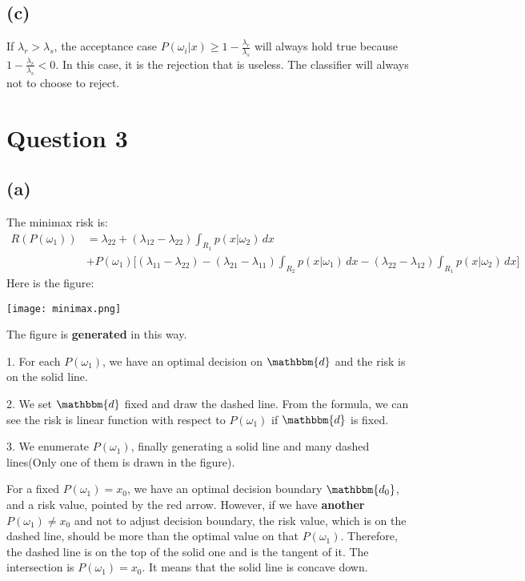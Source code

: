 \documentclass{article}
\newcommand{\question}[1]{\section*{Question #1}}
\renewcommand{\part}[1]{\subsection*{(#1)}}
\begin{document}
\part{c}
If $\lambda_r > \lambda_s$, the acceptance case $P(\omega_i | x) \geq 1 - \frac{\lambda_r}{\lambda_s}$ will always hold true because $1 - \frac{\lambda_r}{\lambda_s} < 0$. In this case, it is the rejection that is useless. The classifier will always not to choose to reject.
\question{3}
\part{a}
The minimax risk is:
\begin{align*}
  R(P(\omega_1)) &= \lambda_{22} + (\lambda_{12} - \lambda_{22}) \int_{R_1}p(x|\omega_2) \, dx \\
  &+ P(\omega_1) \bigg[ (\lambda_{11} - \lambda_{22}) - (\lambda_{21} - \lambda_{11})\int_{R_2}p(x|\omega_1) \, dx - (\lambda_{22} - \lambda_{12})\int_{R_1}p(x|\omega_2) \, dx \bigg ]
\end{align*}
Here is the figure: \\
\begin{center}
  \texttt{[image: minimax.png]}
\end{center} \par
The figure is \textbf{generated} in this way. \par
1. For each $P(\omega_1)$, we have an optimal decision on $\mathbbm{d}$ and the risk is on the solid line. \par
2. We set $\mathbbm{d}$ fixed and draw the dashed line. From the formula, we can see the risk is linear function with respect to $P(\omega_1)$ if $\mathbbm{d}$ is fixed. \par
3. We enumerate $P(\omega_1)$, finally generating a solid line and many dashed lines(Only one of them is drawn in the figure). \par

For a fixed $P(\omega_1) = x_0$, we have an optimal decision boundary $\mathbbm{d_0}$, and a risk value, pointed by the red arrow. However, if we have \textbf{another} $P(\omega_1) \neq x_0$ and not to adjust decision boundary, the risk value, which is on the dashed line, should be more than the optimal value on that $P(\omega_1)$. Therefore, the dashed line is on the top of the solid one and is the tangent of it. The intersection is $P(\omega_1) = x_0$. It means that the solid line is concave down.
\end{document}
